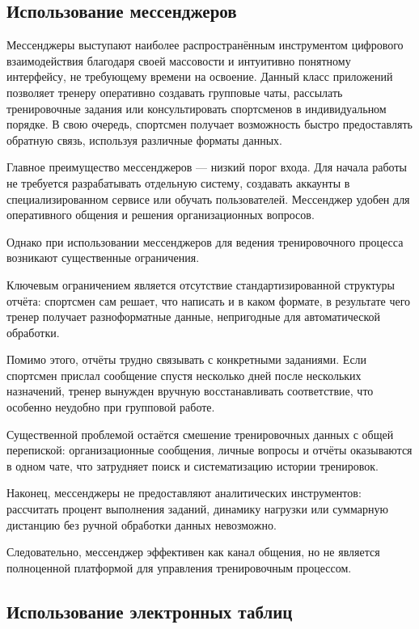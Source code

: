\subsection{Использование мессенджеров}

Мессенджеры выступают наиболее распространённым инструментом цифрового взаимодействия благодаря своей массовости и интуитивно понятному интерфейсу, не требующему времени на освоение. Данный класс приложений позволяет тренеру оперативно создавать групповые чаты, рассылать тренировочные задания или консультировать спортсменов в индивидуальном порядке. В свою очередь, спортсмен получает возможность быстро предоставлять обратную связь, используя различные форматы данных.

Главное преимущество мессенджеров --- низкий порог входа. Для начала работы не требуется разрабатывать отдельную систему, создавать аккаунты в специализированном сервисе или обучать пользователей. Мессенджер удобен для оперативного общения и решения организационных вопросов.

Однако при использовании мессенджеров для ведения тренировочного процесса возникают существенные ограничения.

Ключевым ограничением является отсутствие стандартизированной структуры отчёта: спортсмен сам решает, что написать и в каком формате, в результате чего тренер получает разноформатные данные, непригодные для автоматической обработки.

Помимо этого, отчёты трудно связывать с конкретными заданиями. Если спортсмен прислал сообщение спустя несколько дней после нескольких назначений, тренер вынужден вручную восстанавливать соответствие, что особенно неудобно при групповой работе.

Существенной проблемой остаётся смешение тренировочных данных с общей перепиской: организационные сообщения, личные вопросы и отчёты оказываются в одном чате, что затрудняет поиск и систематизацию истории тренировок.

Наконец, мессенджеры не предоставляют аналитических инструментов: рассчитать процент выполнения заданий, динамику нагрузки или суммарную дистанцию без ручной обработки данных невозможно.

Следовательно, мессенджер эффективен как канал общения, но не является полноценной платформой для управления тренировочным процессом.

\subsection{Использование электронных таблиц}

